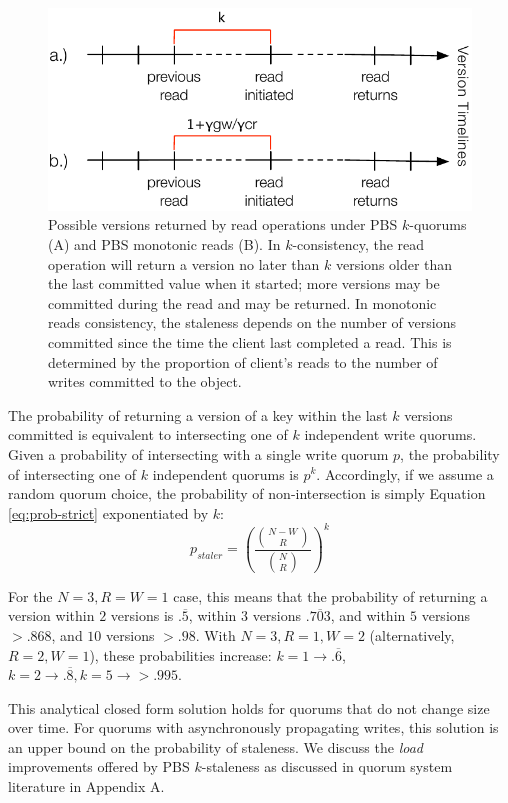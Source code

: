\documentclass{vldb}
\begin{document}
\begin{figure}
\centering
\includegraphics[width=\columnwidth]{figs/timelines.pdf}
\caption{Possible versions returned by read operations under
  PBS $k$-quorums (A) and PBS monotonic reads (B). In
  $k$-consistency, the read operation will return a version no later
  than $k$ versions older than the last committed value when it
  started; more versions may be committed during the read and may be
  returned.  In monotonic reads consistency, the staleness depends on
  the number of versions committed since the time the client last
  completed a read.  This is determined by the proportion of client's
  reads to the number of writes committed to the object.}
\label{fig:timelines}
\end{figure}

The probability of returning a version of a key within the last $k$
versions committed is equivalent to intersecting one of $k$
independent write quorums.  Given a probability of intersecting with a
single write quorum $p$, the probability of intersecting one of $k$
independent quorums is $p^k$.  Accordingly, if we assume a random
quorum choice, the probability of non-intersection is simply Equation
\ref{eq:prob-strict} exponentiated by $k$:
\begin{equation}
\label{eq:k-consistency}
p_{staler} = \left(\frac{{N-W \choose R}}{{N \choose R}}\right)^k
\end{equation}

For the $N=3, R=W=1$ case, this means that the probability of
returning a version within $2$ versions is $.\overline{5}$, within $3$
versions $.\overline{703}$, and within $5$ versions $> .868$, and $10$
versions $>.98$.  With $N=3, R=1, W=2$ (alternatively, $R=2, W=1$),
these probabilities increase: $k=1 \rightarrow
.\overline{6}$, $k=2 \rightarrow .\overline{8}, k=5 \rightarrow >
.995$.

This analytical closed form solution holds for quorums that do not
change size over time.  For quorums with asynchronously propagating
writes, this solution is an upper bound on the probability of
staleness.  We discuss the \textit{load} improvements offered by PBS
$k$-staleness as discussed in quorum system literature in Appendix A.
\end{document}
